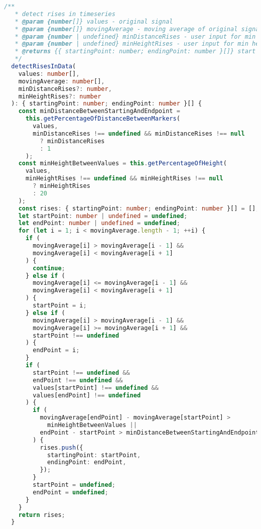 \begin{lstlisting}[language=Typescript]
  /**
   * detect rises in timeseries
   * @param {number[]} values - original signal
   * @param {number[]} movingAverage - moving average of original signal
   * @param {number | undefined} minDistanceRises - user input for min distance
   * @param {number | undefined} minHeightRises - user input for min height
   * @returns {{ startingPoint: number; endingPoint: number }[]} start and end indices of rises
   */
  detectRisesInData(
    values: number[],
    movingAverage: number[],
    minDistanceRises?: number,
    minHeightRises?: number
  ): { startingPoint: number; endingPoint: number }[] {
    const minDistanceBetweenStartingAndEndpoint =
      this.getPercentageOfDistanceBetweenMarkers(
        values,
        minDistanceRises !== undefined && minDistanceRises !== null
          ? minDistanceRises
          : 1
      );
    const minHeightBetweenValues = this.getPercentageOfHeight(
      values,
      minHeightRises !== undefined && minHeightRises !== null
        ? minHeightRises
        : 20
    );
    const rises: { startingPoint: number; endingPoint: number }[] = [];
    let startPoint: number | undefined = undefined;
    let endPoint: number | undefined = undefined;
    for (let i = 1; i < movingAverage.length - 1; ++i) {
      if (
        movingAverage[i] > movingAverage[i - 1] &&
        movingAverage[i] < movingAverage[i + 1]
      ) {
        continue;
      } else if (
        movingAverage[i] <= movingAverage[i - 1] &&
        movingAverage[i] < movingAverage[i + 1]
      ) {
        startPoint = i;
      } else if (
        movingAverage[i] > movingAverage[i - 1] &&
        movingAverage[i] >= movingAverage[i + 1] &&
        startPoint !== undefined
      ) {
        endPoint = i;
      }
      if (
        startPoint !== undefined &&
        endPoint !== undefined &&
        values[startPoint] !== undefined &&
        values[endPoint] !== undefined 
      ) {
        if (
          movingAverage[endPoint] - movingAverage[startPoint] >
            minHeightBetweenValues ||
          endPoint - startPoint > minDistanceBetweenStartingAndEndpoint
        ) {
          rises.push({
            startingPoint: startPoint,
            endingPoint: endPoint,
          });
        }
        startPoint = undefined;
        endPoint = undefined;
      }
    }
    return rises;
  }


\end{lstlisting}
